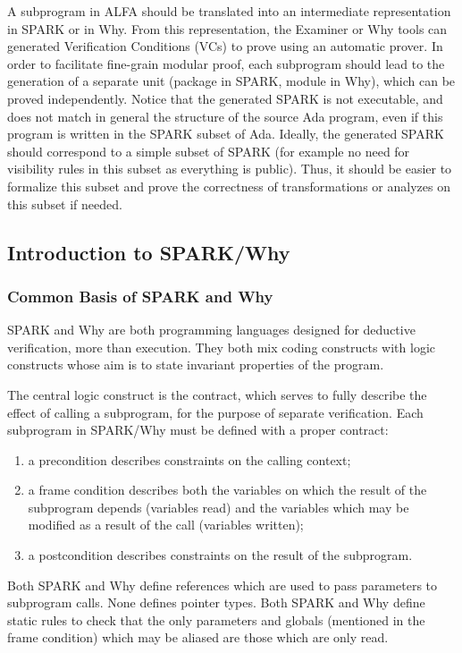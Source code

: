 \documentclass[fullpage]{article}
\newcounter{example}
\begin{document}
A subprogram in ALFA should be translated into an intermediate representation
in SPARK or in Why. From this representation, the Examiner or Why tools can
generated Verification Conditions (VCs) to prove using an automatic prover.  In
order to facilitate fine-grain modular proof, each subprogram should lead to
the generation of a separate unit (package in SPARK, module in Why), which can
be proved independently. Notice that the generated SPARK is not executable, and
does not match in general the structure of the source Ada program, even if this
program is written in the SPARK subset of Ada. Ideally, the generated SPARK
should correspond to a simple subset of SPARK (for example no need for
visibility rules in this subset as everything is public). Thus, it should be
easier to formalize this subset and prove the correctness of transformations or
analyzes on this subset if needed.

\subsection{Introduction to SPARK/Why}

\subsubsection{Common Basis of SPARK and Why}

SPARK and Why are both programming languages designed for deductive
verification, more than execution. They both mix coding constructs with logic
constructs whose aim is to state invariant properties of the program.

The central logic construct is the contract, which serves to fully describe the
effect of calling a subprogram, for the purpose of separate verification. Each
subprogram in SPARK/Why must be defined with a proper contract:
\begin{enumerate}
\item a precondition describes constraints on the calling context;
\item a frame condition describes both the variables on which the result of the
  subprogram depends (variables read) and the variables which may be modified
  as a result of the call (variables written);
\item a postcondition describes constraints on the result of the subprogram.
\end{enumerate}

Both SPARK and Why define references which are used to pass parameters to
subprogram calls. None defines pointer types. Both SPARK and Why define static
rules to check that the only parameters and globals (mentioned in the frame
condition) which may be aliased are those which are only read.
\end{document}
